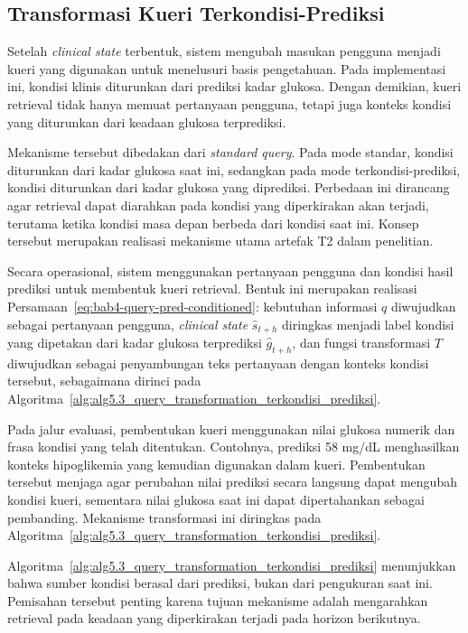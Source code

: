 \subsection{Transformasi Kueri Terkondisi-Prediksi}
\label{subsec:bab5-query-transformation-terkondisi-prediksi}

Setelah \textit{clinical state} terbentuk, sistem mengubah masukan pengguna menjadi kueri yang digunakan untuk menelusuri basis pengetahuan. Pada implementasi ini,
kondisi klinis diturunkan dari prediksi kadar glukosa. Dengan demikian, kueri retrieval tidak hanya memuat pertanyaan pengguna, tetapi juga konteks kondisi yang
diturunkan dari keadaan glukosa terprediksi.

Mekanisme tersebut dibedakan dari \textit{standard query}. Pada mode standar, kondisi diturunkan dari kadar glukosa saat ini, sedangkan pada mode
terkondisi-prediksi, kondisi diturunkan dari kadar glukosa yang diprediksi. Perbedaan ini dirancang agar retrieval dapat diarahkan pada kondisi
yang diperkirakan akan terjadi, terutama ketika kondisi masa depan berbeda dari kondisi saat ini. Konsep tersebut merupakan realisasi mekanisme utama artefak
T2 dalam penelitian.

Secara operasional, sistem menggunakan pertanyaan pengguna dan kondisi hasil prediksi untuk membentuk kueri retrieval. Bentuk ini merupakan realisasi
Persamaan~\ref{eq:bab4-query-pred-conditioned}: kebutuhan informasi $q$ diwujudkan sebagai pertanyaan pengguna, \textit{clinical state} $\hat{s}_{t+h}$
diringkas menjadi label kondisi yang dipetakan dari kadar glukosa terprediksi $\hat{g}_{t+h}$, dan fungsi transformasi $T$ diwujudkan sebagai penyambungan
teks pertanyaan dengan konteks kondisi tersebut, sebagaimana dirinci pada Algoritma~\ref{alg:alg5.3_query_transformation_terkondisi_prediksi}.

Pada jalur evaluasi, pembentukan kueri menggunakan nilai glukosa numerik dan frasa kondisi yang telah ditentukan. Contohnya, prediksi 58 mg/dL menghasilkan
konteks hipoglikemia yang kemudian digunakan dalam kueri. Pembentukan tersebut menjaga agar perubahan nilai prediksi secara langsung dapat mengubah kondisi
kueri, sementara nilai glukosa saat ini dapat dipertahankan sebagai pembanding. Mekanisme transformasi ini diringkas pada
Algoritma~\ref{alg:alg5.3_query_transformation_terkondisi_prediksi}.



Algoritma~\ref{alg:alg5.3_query_transformation_terkondisi_prediksi} menunjukkan bahwa sumber kondisi berasal dari prediksi, bukan dari pengukuran saat ini.
Pemisahan tersebut penting karena tujuan mekanisme adalah mengarahkan retrieval pada keadaan yang diperkirakan terjadi pada horizon berikutnya.

